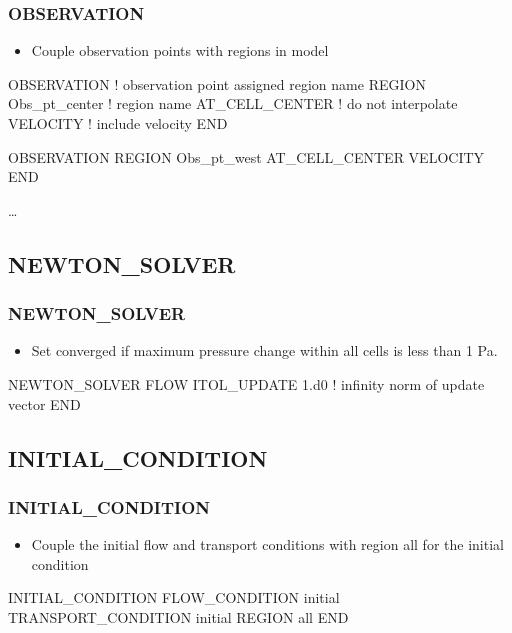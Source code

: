 \documentclass{beamer}
\newcommand\bluecomment[1]{{{\color{blue} #1}}}
\newcommand\greencomment[1]{{{\color{green} #1}}}
\begin{document}
\begin{frame}[fragile]\frametitle{OBSERVATION}

\begin{itemize}
\item Couple observation points with regions in model
\end{itemize}

\begin{semiverbatim}
OBSERVATION  \bluecomment{! observation point assigned region name}
  REGION Obs_pt_center  \bluecomment{! region name}
  AT_CELL_CENTER        \bluecomment{! do not interpolate}
  VELOCITY              \bluecomment{! include velocity}
END

OBSERVATION
  REGION Obs_pt_west
  AT_CELL_CENTER
  VELOCITY
END

\dots
\end{semiverbatim}

\end{frame}

\subsection{NEWTON\_SOLVER}

\begin{frame}[fragile]\frametitle{NEWTON\_SOLVER}

\begin{itemize}
  \item Set converged if maximum pressure change within all cells is less than 1 Pa.
\end{itemize}

\begin{semiverbatim}

NEWTON_SOLVER FLOW
  ITOL_UPDATE 1.d0   \bluecomment{! infinity norm of update vector}
END
\end{semiverbatim}

\end{frame}

\subsection{INITIAL\_CONDITION}

\begin{frame}[fragile]\frametitle{INITIAL\_CONDITION}

\begin{itemize}
\item Couple the \greencomment{initial} flow and transport conditions with region \greencomment{all} for the initial condition
\end{itemize}

\begin{semiverbatim}

INITIAL_CONDITION
  FLOW_CONDITION initial
  TRANSPORT_CONDITION initial
  REGION all
END

\end{semiverbatim}

\end{frame}
\end{document}
